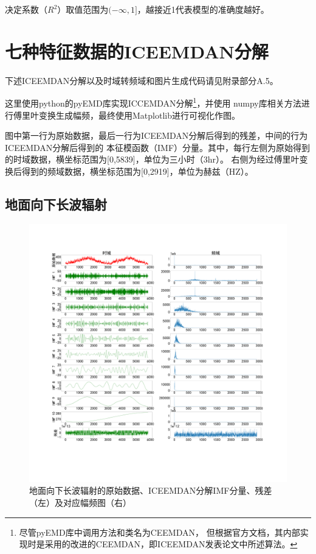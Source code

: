 \documentclass[AutoFakeBold]{LZUThesis}
\begin{document}
决定系数（$R^2$）取值范围为$(-\infty, 1]$，越接近1代表模型的准确度越好。

\section{七种特征数据的ICEEMDAN分解}
下述ICEEMDAN分解以及时域转频域和图片生成代码请见附录部分A.5。

这里使用python的pyEMD库实现ICCEMDAN分解\footnote{尽管pyEMD库中调用方法和类名为CEEMDAN，
但根据官方文档，其内部实现时是采用的改进的CEEMDAN，即ICEEMDAN发表论文中所述算法。}，并使用
numpy库相关方法进行傅里叶变换生成幅频，最终使用Matplotlib进行可视化作图。

图中第一行为原始数据，最后一行为ICEEMDAN分解后得到的残差，中间的行为ICEEMDAN分解后得到的
本征模函数（IMF）分量。其中，每行左侧为原始得到的时域数据，横坐标范围为[0,5839]，单位为三小时（3hr）。
右侧为经过傅里叶变换后得到的频域数据，横坐标范围为[0,2919]，单位为赫兹（HZ）。

\subsection{地面向下长波辐射}
\begin{figure}[H]
	\centering
    \includegraphics[width=1\textwidth]{figures/lrad.pdf}
    \caption{地面向下长波辐射的原始数据、ICEEMDAN分解IMF分量、残差（左）及对应幅频图（右）}
    \label{fig_lrad}
\end{figure}
\end{document}
